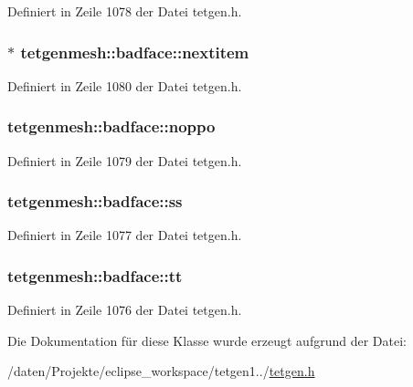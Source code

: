 Definiert in Zeile 1078 der Datei tetgen.\-h.

\hypertarget{classtetgenmesh_1_1badface_ae87a801b03dbaa3dd5709ffed5eef5bc}{
\subsubsection[{nextitem}]{$\ast$ tetgenmesh\-::badface\-::nextitem}}\label{classtetgenmesh_1_1badface_ae87a801b03dbaa3dd5709ffed5eef5bc}


Definiert in Zeile 1080 der Datei tetgen.\-h.

\hypertarget{classtetgenmesh_1_1badface_ada4ec358fcf9261b2f14cff307e66fdf}{
\subsubsection[{noppo}]{ tetgenmesh\-::badface\-::noppo}}\label{classtetgenmesh_1_1badface_ada4ec358fcf9261b2f14cff307e66fdf}


Definiert in Zeile 1079 der Datei tetgen.\-h.

\hypertarget{classtetgenmesh_1_1badface_ace098878b5e89ec387c959d8acd0153d}{
\subsubsection[{ss}]{ tetgenmesh\-::badface\-::ss}}\label{classtetgenmesh_1_1badface_ace098878b5e89ec387c959d8acd0153d}


Definiert in Zeile 1077 der Datei tetgen.\-h.

\hypertarget{classtetgenmesh_1_1badface_a01d24569e6058b3dae1a31e0638b849c}{
\subsubsection[{tt}]{ tetgenmesh\-::badface\-::tt}}\label{classtetgenmesh_1_1badface_a01d24569e6058b3dae1a31e0638b849c}


Definiert in Zeile 1076 der Datei tetgen.\-h.



Die Dokumentation für diese Klasse wurde erzeugt aufgrund der Datei\-:\begin{DoxyCompactItemize}
\item 
/daten/\-Projekte/eclipse\-\_\-workspace/tetgen1../\hyperlink{tetgen_8h}{tetgen.\-h}\end{DoxyCompactItemize}
